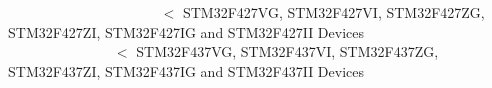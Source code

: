 ~\newline
~\newline
~\newline
~\newline
~\newline
~\newline
~\newline
~\newline
~\newline
~\newline
~\newline
~\newline
~\newline
 $<$ S\+T\+M32\+F427\+VG, S\+T\+M32\+F427\+VI, S\+T\+M32\+F427\+ZG, S\+T\+M32\+F427\+ZI, S\+T\+M32\+F427\+IG and S\+T\+M32\+F427\+II Devices ~\newline
~\newline
~\newline
~\newline
~\newline
~\newline
~\newline
~\newline
~\newline
~\newline
~\newline
~\newline
~\newline
~\newline
~\newline
~\newline
~\newline
~\newline
~\newline
~\newline
~\newline
 $<$ S\+T\+M32\+F437\+VG, S\+T\+M32\+F437\+VI, S\+T\+M32\+F437\+ZG, S\+T\+M32\+F437\+ZI, S\+T\+M32\+F437\+IG and S\+T\+M32\+F437\+II Devices ~\newline
~\newline
~\newline
~\newline
~\newline
~\newline
~\newline
~\newline
~\newline
~\newline
~\newline
~\newline
~\newline
